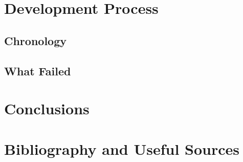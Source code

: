\documentclass{article}
\begin{document}
\section{Development Process}
\subsection{Chronology}
\subsection{What Failed}

\section{Conclusions}

\section{Bibliography and Useful Sources}
\end{document}
